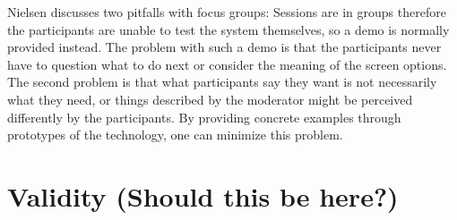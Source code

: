 Nielsen \cite{focusGroup} discusses two pitfalls with focus groups: Sessions are in groups therefore the participants are unable to test the system themselves, so a demo is normally provided instead. The problem with such a demo is that the participants never have to question what to do next or consider the meaning of the screen options. The second problem is that what participants say they want is not necessarily what they need, or things described by the moderator might be perceived differently by the participants. By providing concrete examples through prototypes of the technology, one can minimize this problem.

\section{Validity (Should this be here?)}

